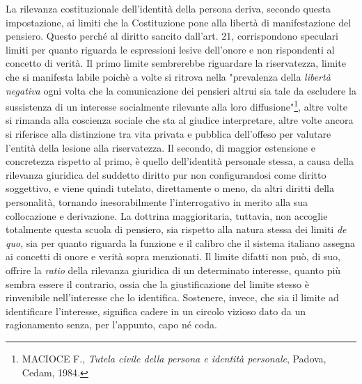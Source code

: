 La rilevanza costituzionale dell'identità della persona deriva, secondo questa impostazione, ai limiti che la Costituzione pone alla libertà di manifestazione del pensiero. Questo perché al diritto sancito dall'art. 21, corrispondono speculari limiti per quanto riguarda le espressioni lesive dell'onore e non rispondenti al concetto di verità.
Il primo limite sembrerebbe riguardare la riservatezza, limite che si manifesta labile poichè a volte si ritrova nella "prevalenza della \textit{libertà negativa} ogni volta che la comunicazione dei pensieri altrui sia tale da escludere la sussistenza di un interesse socialmente rilevante alla loro diffusione"\footnote{MACIOCE F., \textit{Tutela civile della persona e identità personale}, Padova, Cedam, 1984.}, altre volte si rimanda alla coscienza sociale che sta al giudice interpretare, altre volte ancora si riferisce alla distinzione tra vita privata e pubblica dell'offeso per valutare l'entità della lesione alla riservatezza.
Il secondo, di maggior estensione e concretezza rispetto al primo, è quello dell'identità personale stessa, a causa della rilevanza giuridica del suddetto diritto pur non configurandosi come diritto soggettivo, e viene quindi tutelato, direttamente o  meno, da altri diritti della personalità, tornando inesorabilmente l'interrogativo in merito alla sua collocazione e derivazione. 
La dottrina maggioritaria, tuttavia, non accoglie totalmente questa scuola di pensiero, sia rispetto alla natura stessa dei limiti \textit{de quo}, sia per quanto riguarda la funzione e il calibro che il sistema italiano assegna ai concetti di onore e verità sopra menzionati.
Il limite difatti non può, di suo, offrire la \textit{ratio} della rilevanza giuridica di un determinato interesse, quanto più sembra essere il contrario, ossia che la giustificazione del limite stesso è rinvenibile nell'interesse che lo identifica. Sostenere, invece, che sia il limite ad identificare l'interesse, significa cadere in un circolo vizioso dato da un ragionamento senza, per l'appunto, capo né coda.
